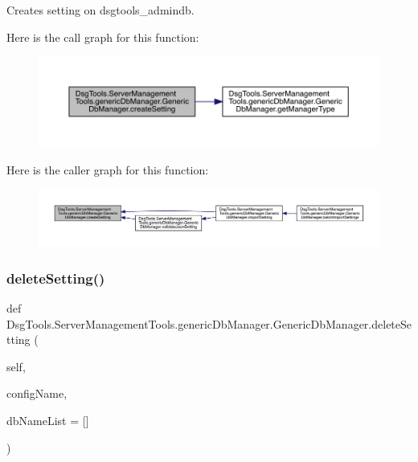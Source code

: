 \begin{DoxyVerb}Creates setting on dsgtools_admindb.
\end{DoxyVerb}
 Here is the call graph for this function\+:
\nopagebreak
\begin{figure}[H]
\begin{center}
\leavevmode
\includegraphics[width=350pt]{class_dsg_tools_1_1_server_management_tools_1_1generic_db_manager_1_1_generic_db_manager_a254da2318a0a95fb0ddd84f6b0eb8333_cgraph}
\end{center}
\end{figure}
Here is the caller graph for this function\+:
\nopagebreak
\begin{figure}[H]
\begin{center}
\leavevmode
\includegraphics[width=350pt]{class_dsg_tools_1_1_server_management_tools_1_1generic_db_manager_1_1_generic_db_manager_a254da2318a0a95fb0ddd84f6b0eb8333_icgraph}
\end{center}
\end{figure}
\mbox{\label{class_dsg_tools_1_1_server_management_tools_1_1generic_db_manager_1_1_generic_db_manager_a3154565227241e71d7a8763f978aa7a4}} 
\subsubsection{\texorpdfstring{delete\+Setting()}{deleteSetting()}}
{\footnotesize\ttfamily def Dsg\+Tools.\+Server\+Management\+Tools.\+generic\+Db\+Manager.\+Generic\+Db\+Manager.\+delete\+Setting (\begin{DoxyParamCaption}\item[{}]{self,  }\item[{}]{config\+Name,  }\item[{}]{db\+Name\+List = {\ttfamily \mbox{[}\mbox{]}} }\end{DoxyParamCaption})}

